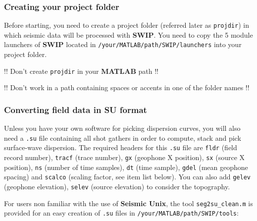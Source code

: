 \documentclass[twoside,a4paper]{article}
\def\SWIP{\textbf{SWIP}}
\def\SeismicUnix{\textbf{Seismic Unix}}
\def\MATLAB{\textbf{MATLAB}}
\begin{document}
\subsubsection{Creating your project folder}
Before starting, you need to create a project folder (referred later as \verb|projdir|) in which seismic data will be processed with {\SWIP}. You need to copy the 5 module launchers of {\SWIP} located in \verb|/your/MATLAB/path/SWIP/launchers| into your project folder.

!! Don't create \verb|projdir| in your {\MATLAB} path !!

!! Don't work in a path containing spaces or accents in one of the folder names !!

\subsubsection{Converting field data in SU format}
\label{sec:seg2su}
Unless you have your own software for picking dispersion curves, you will also need a \verb|.su| file containing all shot gathers in order to compute, stack and pick surface-wave dispersion. The required headers for this \verb|.su| file are \verb|fldr| (field record number), \verb|tracf| (trace number), \verb|gx| (geophone X position), \verb|sx| (source X position), \verb|ns| (number of time samples), \verb|dt| (time sample), \verb|gdel| (mean geophone spacing) and \verb|scalco| (scaling factor, see item list below). You can also add \verb|gelev| (geophone elevation), \verb|selev| (source elevation) to consider the topography. 

For users non familiar with the use of {\SeismicUnix}, the tool \verb|seg2su_clean.m| is provided for an easy creation of \verb|.su| files in \verb|/your/MATLAB/path/SWIP/tools|:
\end{document}

